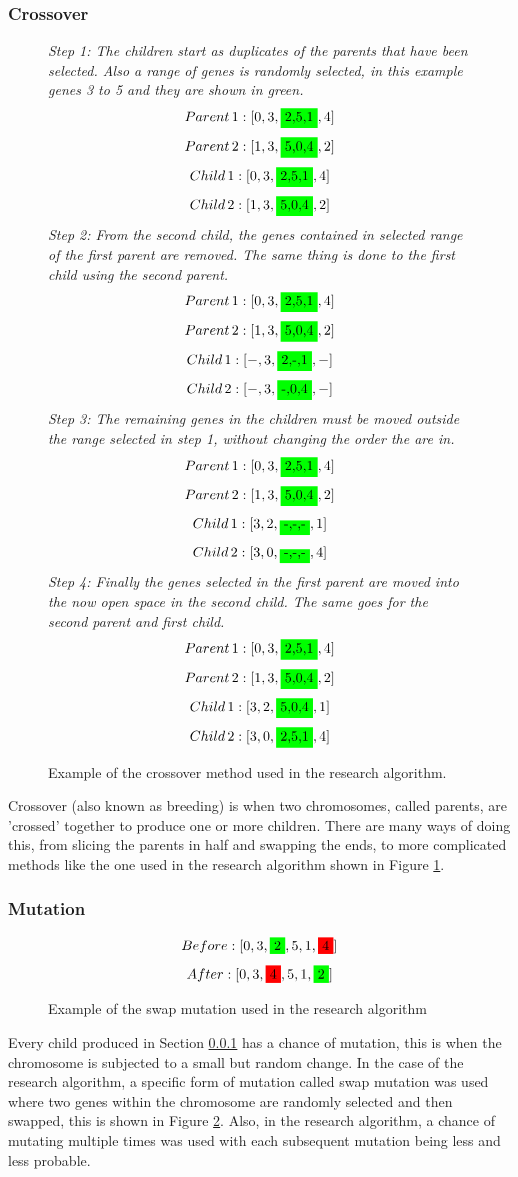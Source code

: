 \subsubsection{Crossover}\label{crossover}
\par
\begin{figure}[h]
\textit{Step 1: The children start as duplicates of the parents that have been selected. Also a range of genes is randomly selected, in this example genes 3 to 5 and they are shown in green.}
\[Parent\, 1: [0,3,\colorbox{green}{2,5,1},4]\]
\[Parent\, 2: [1,3,\colorbox{green}{5,0,4},2]\]
\[Child\, 1: [0,3,\colorbox{green}{2,5,1},4]\]
\[Child\, 2: [1,3,\colorbox{green}{5,0,4},2]\]
\textit{Step 2: From the second child, the genes contained in selected range of the first parent are removed. The same thing is done to the first child using the second parent.}
\[Parent\, 1: [0,3,\colorbox{green}{2,5,1},4]\]
\[Parent\, 2: [1,3,\colorbox{green}{5,0,4},2]\]
\[Child\, 1: [-,3,\colorbox{green}{2,-,1},-]\]
\[Child\, 2: [-,3,\colorbox{green}{-,0,4},-]\]
\textit{Step 3: The remaining genes in the children must be moved outside the range selected in step 1, without changing the order the are in.}
\[Parent\, 1: [0,3,\colorbox{green}{2,5,1},4]\]
\[Parent\, 2: [1,3,\colorbox{green}{5,0,4},2]\]
\[Child\, 1: [3,2,\colorbox{green}{-,-,-},1]\]
\[Child\, 2: [3,0,\colorbox{green}{-,-,-},4]\]
\textit{Step 4: Finally the genes selected in the first parent are moved into the now open space in the second child. The same goes for the second parent and first child.}
\[Parent\, 1: [0,3,\colorbox{green}{2,5,1},4]\]
\[Parent\, 2: [1,3,\colorbox{green}{5,0,4},2]\]
\[Child\, 1: [3,2,\colorbox{green}{5,0,4},1]\]
\[Child\, 2: [3,0,\colorbox{green}{2,5,1},4]\]
\caption{Example of the crossover method used in the research algorithm. \label{fig:cross}}
\end{figure}
Crossover (also known as breeding) is when two chromosomes, called parents, are 'crossed' together to produce one or more children. There are many ways of doing this, from slicing the parents in half and swapping the ends, to more complicated methods like the one used in the research algorithm shown in Figure \ref{fig:cross}. 
\subsubsection{Mutation}
\par
\begin{figure}[h]
\[Before: [0,3,\colorbox{green}{2},5,1,\colorbox{red}{4}]\]
\[After: [0,3,\colorbox{red}{4},5,1,\colorbox{green}{2}]\]
\caption{Example of the swap mutation used in the research algorithm \label{fig:mut}}
\end{figure}
Every child produced in Section \ref{crossover} has a chance of mutation, this is when the chromosome is subjected to a small but random change. In the case of the research algorithm, a specific form of mutation called swap mutation was used where two genes within the chromosome are randomly selected and then swapped, this is shown in Figure \ref{fig:mut}. Also, in the research algorithm, a chance of mutating multiple times was used with each subsequent mutation being less and less probable.
